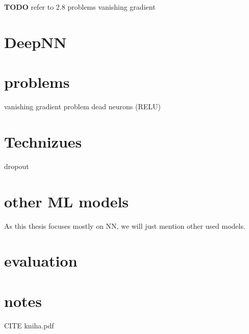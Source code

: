 \textbf{TODO} refer to 2.8 problems vanishing gradient


\section{DeepNN}
\section{problems}
vanishing gradient problem
dead neurons (RELU)
\section{Technizues}
dropout
\section{other ML models}

As this thesis focuses mostly on NN, we will just mention other used models.
\section{evaluation}
\section{notes}

CITE kniha.pdf





